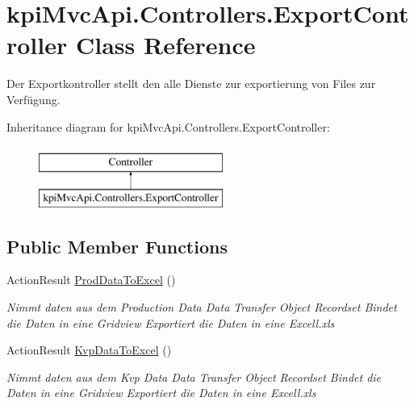 \hypertarget{classkpi_mvc_api_1_1_controllers_1_1_export_controller}{}\section{kpi\+Mvc\+Api.\+Controllers.\+Export\+Controller Class Reference}
\label{classkpi_mvc_api_1_1_controllers_1_1_export_controller}


Der Exportkontroller stellt den alle Dienste zur exportierung von Files zur Verfügung.  


Inheritance diagram for kpi\+Mvc\+Api.\+Controllers.\+Export\+Controller\+:\begin{figure}[H]
\begin{center}
\leavevmode
\includegraphics[height=2.000000cm]{classkpi_mvc_api_1_1_controllers_1_1_export_controller}
\end{center}
\end{figure}
\subsection*{Public Member Functions}
\begin{DoxyCompactItemize}
\item 
Action\+Result \hyperlink{classkpi_mvc_api_1_1_controllers_1_1_export_controller_a7f779c9cca92a11fd9c37bfef15c0ad4}{Prod\+Data\+To\+Excel} ()
\begin{DoxyCompactList}\small\item\em Nimmt daten aus dem Production Data Data Transfer Object Recordset Bindet die Daten in eine Gridview Exportiert die Daten in eine Excell.\+xls \end{DoxyCompactList}\item 
Action\+Result \hyperlink{classkpi_mvc_api_1_1_controllers_1_1_export_controller_a5350dfcc0605aeb646490cdedd3374bc}{Kvp\+Data\+To\+Excel} ()
\begin{DoxyCompactList}\small\item\em Nimmt daten aus dem Kvp Data Data Transfer Object Recordset Bindet die Daten in eine Gridview Exportiert die Daten in eine Excell.\+xls \end{DoxyCompactList}\end{DoxyCompactItemize}



